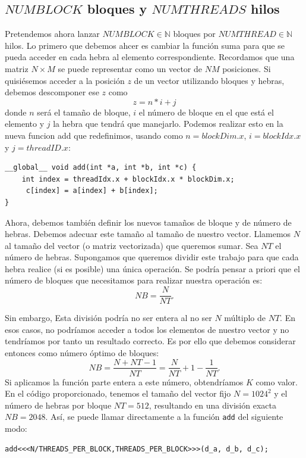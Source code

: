 \documentclass[11pt]{article}
\def\inline{\lstinline[basicstyle=\ttfamily,keywordstyle={}]}
\theoremstyle{plain}
\begin{document}
\subsection{$NUMBLOCK$ bloques y $NUMTHREADS$ hilos}

Pretendemos ahora lanzar $NUMBLOCK \in \mathbb N$ bloques por $NUMTHREAD \in \mathbb N$ hilos. Lo primero que debemos ahcer es cambiar la función suma para que se pueda acceder en cada hebra al elemento correspondiente. Recordamos que una matriz $N\times M$ se puede representar como un vector de $NM$ posiciones. Si quisiésemos acceder a la posición $z$ de un vector utilizando bloques y hebras, debemos descomponer ese $z$ como
\[
z = n*i + j	
\]
donde $n$ será el tamaño de bloque, $i$ el número de bloque en el que está el elemento y $j$ la hebra que tendrá que manejarlo. Podemos realizar esto en la nueva funcion add que redefinimos, usando como $n=blockDim.x$, $i = blockIdx.x$ y $j = threadID.x$:
\begin{verbatim}
__global__ void add(int *a, int *b, int *c) {
	int index = threadIdx.x + blockIdx.x * blockDim.x;
	 c[index] = a[index] + b[index]; 
}
\end{verbatim}

Ahora, debemos también definir los nuevos tamaños de bloque y de número de hebras. Debemos adecuar este tamaño al tamaño de nuestro vector. Llamemos $N$ al tamaño del vector (o matriz vectorizada) que queremos sumar. Sea $NT$ el número de hebras. Supongamos que queremos dividir este trabajo para que cada hebra realice (si es posible) una única operación. Se podría pensar a priori que el número de bloques que necesitamos para realizar nuestra operación es:
\[
NB = \frac{N}{NT}.
\]

Sin embargo, Esta división podría no ser entera al no ser $N$ múltiplo de $NT$. En esos casos, no podríamos acceder a todos los elementos de nuestro vector y no tendríamos por tanto un resultado correcto. Es por ello que debemos considerar entonces como número óptimo de bloques:
\[
NB = \frac{N + NT - 1}{NT} = \frac{N}{NT} + 1 - \frac{1}{NT}.
\]
Si aplicamos la función parte entera a este número, obtendríamos $K$ como valor. En el código proporcionado, tenemos el tamaño del vector fijo $N = 1024^2$ y el número de hebras por bloque $NT = 512$, resultando en una división exacta $NB = 2048$. Así, se puede llamar directamente a la función \inline{add} del siguiente modo:
\begin{verbatim}
add<<<N/THREADS_PER_BLOCK,THREADS_PER_BLOCK>>>(d_a, d_b, d_c);
\end{verbatim}
\end{document}
